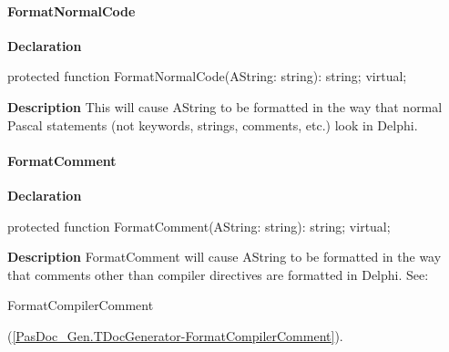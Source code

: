 \documentclass{report}
\newif\ifpdf
\begin{document}
\paragraph*{FormatNormalCode}\hspace*{\fill}

\label{PasDoc_Gen.TDocGenerator-FormatNormalCode}
\begin{list}{}{
\setlength{\itemindent}{0cm}
\setlength{\listparindent}{0cm}
\setlength{\leftmargin}{\evensidemargin}
\addtolength{\leftmargin}{\tmplength}
\settowidth{\labelsep}{X}
\addtolength{\leftmargin}{\labelsep}
\setlength{\labelwidth}{\tmplength}
}
\item[\textbf{Declaration}\hfill]
\ifpdf
\begin{flushleft}
\fi
\begin{ttfamily}
protected function FormatNormalCode(AString: string): string; virtual;\end{ttfamily}

\ifpdf
\end{flushleft}
\fi

\par
\item[\textbf{Description}]
This will cause AString to be formatted in the way that normal Pascal statements (not keywords, strings, comments, etc.) look in Delphi.

\end{list}
\paragraph*{FormatComment}\hspace*{\fill}

\label{PasDoc_Gen.TDocGenerator-FormatComment}
\begin{list}{}{
\setlength{\itemindent}{0cm}
\setlength{\listparindent}{0cm}
\setlength{\leftmargin}{\evensidemargin}
\addtolength{\leftmargin}{\tmplength}
\settowidth{\labelsep}{X}
\addtolength{\leftmargin}{\labelsep}
\setlength{\labelwidth}{\tmplength}
}
\item[\textbf{Declaration}\hfill]
\ifpdf
\begin{flushleft}
\fi
\begin{ttfamily}
protected function FormatComment(AString: string): string; virtual;\end{ttfamily}

\ifpdf
\end{flushleft}
\fi

\par
\item[\textbf{Description}]
FormatComment will cause AString to be formatted in the way that comments other than compiler directives are formatted in Delphi. See: \begin{ttfamily}FormatCompilerComment\end{ttfamily}(\ref{PasDoc_Gen.TDocGenerator-FormatCompilerComment}).

\end{list}
\end{document}
